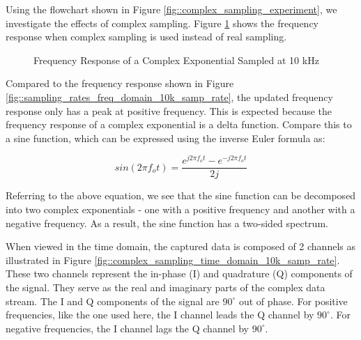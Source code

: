 \documentclass{article}
\begin{document}
Using the flowchart shown in Figure \ref{fig::complex_sampling_experiment}, we investigate the effects of complex sampling. Figure \ref{fig::complex_sampling_freq_domain_10k_samp_rate} shows the frequency response when complex sampling is used instead of real sampling.

\begin{figure}[H]
	\centerline{}
	\caption{Frequency Response of a Complex Exponential Sampled at 10 kHz}
	\label{fig::complex_sampling_freq_domain_10k_samp_rate}
\end{figure}

Compared to the frequency response shown in Figure \ref{fig::sampling_rates_freq_domain_10k_samp_rate}, the updated frequency response only has a peak at positive frequency. This is expected because the frequency response of a complex exponential is a delta function. Compare this to a sine function, which can be expressed using the inverse Euler formula as:

\begin{equation}
	sin(2{\pi}{f_o}t) = \frac{e^{j2{\pi}{f_o}t} - e^{-j2{\pi}{f_o}t}}{2j}
\end{equation}

Referring to the above equation, we see that the sine function can be decomposed into two complex exponentials - one with a positive frequency and another with a negative frequency. As a result, the sine function has a two-sided spectrum.

When viewed in the time domain, the captured data is composed of 2 channels as illustrated in Figure \ref{fig::complex_sampling_time_domain_10k_samp_rate}. These two channels represent the in-phase (I) and quadrature (Q) components of the signal. They serve as the real and imaginary parts of the complex data stream. The I and Q components of the signal are $90^\circ$ out of phase. For positive frequencies, like the one used here, the I channel leads the Q channel by $90^\circ$. For negative frequencies, the I channel lags the Q channel by $90^\circ$.
\end{document}
